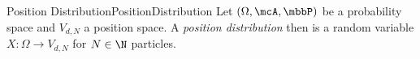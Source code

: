 \begin{mdef}{Position Distribution}{PositionDistribution}
    Let $(\Omega,\mcA,\mbbP)$ be a probability space and $V_{d,N}$ a position space. A \emph{position distribution} then is a random variable $X:\Omega\to V_{d,N}$ for $N\in\N$ particles. 
\end{mdef}